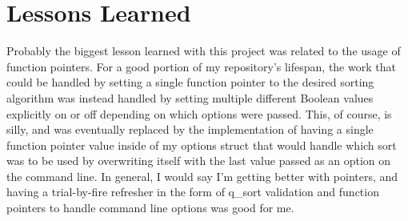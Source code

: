 \documentclass[11pt]{report}
\begin{document}
\section*{Lessons Learned}
Probably the biggest lesson learned with this project was related to the usage of function pointers. For a good portion of my repository's lifespan, the work that could be handled by setting a single function pointer to the desired sorting algorithm was instead handled by setting multiple different Boolean values explicitly on or off depending on which options were passed. This, of course, is silly, and was eventually replaced by the implementation of having a single function pointer value inside of my options struct that would handle which sort was to be used by overwriting itself with the last value passed as an option on the command line. In general, I would say I'm getting better with pointers, and having a trial-by-fire refresher in the form of q\_sort validation and function pointers to handle command line options was good for me.
\end{document}
